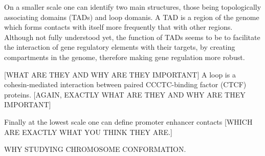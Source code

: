 On a smaller scale one can identify two main structures, those being topologically associating domains (TADs) and loop domanis. A TAD is a region of the genome which forms contacts with itself more frequently that with other regions. Although not fully understood yet, the function of TADs seems to be to facilitate the interaction of gene regulatory elements with their targets, by creating compartments in the genome, therefore making gene regulation more robust\cite{tadrole2018}. 

[WHAT ARE THEY AND WHY ARE THEY IMPORTANT] A loop is a cohesin-mediated interaction between paired CCCTC-binding factor (CTCF) proteins. [AGAIN, EXACTLY WHAT ARE THEY AND WHY ARE THEY IMPORTANT]

Finally at the lowest scale one can define promoter enhancer contacts [WHICH ARE EXACTLY WHAT YOU THINK THEY ARE.]

WHY STUDYING CHROMOSOME CONFORMATION.

